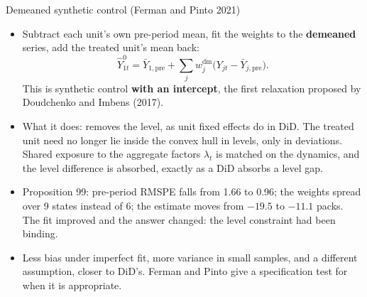 \documentclass[
  11pt,
  ignorenonframetext,
  aspectratio=169,
]{beamer}
\providecommand{\tightlist}{%
  \setlength{\itemsep}{0pt}\setlength{\parskip}{0pt}}
\begin{document}
\begin{frame}{Demeaned synthetic control (Ferman and Pinto 2021)}
\protect{}\label{demeaned-synthetic-control-ferman-and-pinto-2021}
\begin{itemize}
\tightlist
\item
  Subtract each unit's own pre-period mean, fit the weights to the
  \textbf{demeaned} series, add the treated unit's mean back: \[
  \hat Y^0_{1t} = \bar Y_{1,\text{pre}} + \sum_j w_j^{\text{dm}} \big( Y_{jt} - \bar Y_{j,\text{pre}} \big).
  \] This is synthetic control \textbf{with an intercept}, the first
  relaxation proposed by Doudchenko and Imbens (2017).
\item
  What it does: removes the level, as unit fixed effects do in DiD. The
  treated unit need no longer lie inside the convex hull in levels, only
  in deviations. Shared exposure to the aggregate factors \(\lambda_t\)
  is matched on the dynamics, and the level difference is absorbed,
  exactly as a DiD absorbs a level gap.
\item
  Proposition 99: pre-period RMSPE falls from 1.66 to 0.96; the weights
  spread over 9 states instead of 6; the estimate moves from \(-19.5\)
  to \(-11.1\) packs. The fit improved and the answer changed: the level
  constraint had been binding.
\item
  Less bias under imperfect fit, more variance in small samples, and a
  different assumption, closer to DiD's. Ferman and Pinto give a
  specification test for when it is appropriate.
\end{itemize}
\end{frame}
\end{document}
